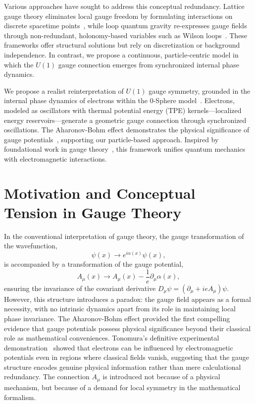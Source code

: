 \documentclass[%
 reprint,
 amsmath,amssymb,
 aps,
]{revtex4-1}
\numberwithin{equation}{section}%
\begin{document}
Various approaches have sought to address this conceptual redundancy. Lattice gauge theory eliminates local gauge freedom by formulating interactions on discrete spacetime points~\cite{wilson1974}, while loop quantum gravity re-expresses gauge fields through non-redundant, holonomy-based variables such as Wilson loops~\cite{rovelli1995}. These frameworks offer structural solutions but rely on discretization or background independence. In contrast, we propose a continuous, particle-centric model in which the $U(1)$ gauge connection emerges from synchronized internal phase dynamics.


We propose a realist reinterpretation of $U(1)$ gauge symmetry, grounded in the internal phase dynamics of electrons within the 0-Sphere model~\cite{hanamura2024quantum}. Electrons, modeled as oscillators with thermal potential energy (TPE) kernels---localized energy reservoirs---generate a geometric gauge connection through synchronized oscillations. The Aharonov-Bohm effect demonstrates the physical significance of gauge potentials~\cite{aharonov1959}, supporting our particle-based approach. Inspired by foundational work in gauge theory~\cite{weyl1929, yang1954}, this framework unifies quantum mechanics with electromagnetic interactions.



\section{Motivation and Conceptual Tension in Gauge Theory}

In the conventional interpretation of gauge theory, the gauge transformation of the wavefunction,
\begin{equation}
\psi(x) \rightarrow e^{i\alpha(x)} \psi(x),
\label{eq:wavefunction}
\end{equation}
is accompanied by a transformation of the gauge potential, 
\begin{equation}
A_\mu(x) \rightarrow A_\mu(x) - \frac{1}{e} \partial_\mu \alpha(x),
\label{eq:gauge_potential}
\end{equation}
ensuring the invariance of the covariant derivative $D_\mu \psi = (\partial_\mu + i e A_\mu) \psi$. However, this structure introduces a paradox: the gauge field appears as a formal necessity, with no intrinsic dynamics apart from its role in maintaining local phase invariance. The Aharonov-Bohm effect provided the first compelling evidence that gauge potentials possess physical significance beyond their classical role as mathematical conveniences. Tonomura's definitive experimental demonstration~\cite{tonomura1986} showed that electrons can be influenced by electromagnetic potentials even in regions where classical fields vanish, suggesting that the gauge structure encodes genuine physical information rather than mere calculational redundancy. The connection $A_\mu$ is introduced not because of a physical mechanism, but because of a demand for local symmetry in the mathematical formalism.
\end{document}
